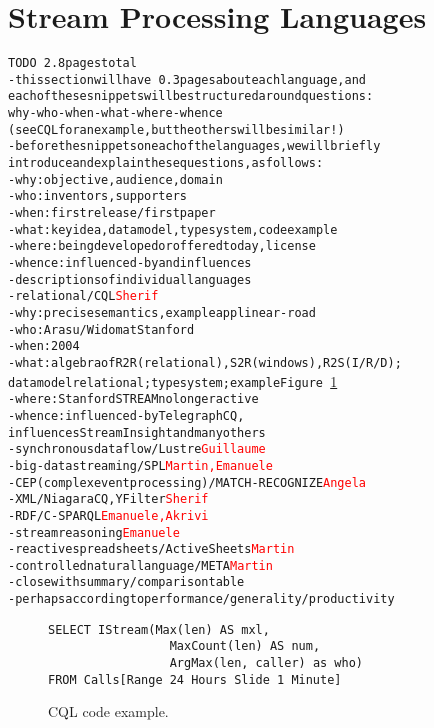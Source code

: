 \section{Stream Processing Languages}\label{sec:languages}

\begin{alltt}TODO\scriptsize ~2.8 pages total
- this section will have ~0.3 pages about each language, and
  each of these snippets will be structured around questions:
  why-who-when-what-where-whence
  (see CQL for an example, but the others will be similar!)
- before the snippets on each of the languages, we will briefly
  introduce and explain these questions, as follows:
  - why: objective, audience, domain
  - who: inventors, supporters
  - when: first release / first paper
  - what: key idea, data model, type system, code example
  - where: being developed or offered today, license
  - whence: influenced-by and influences
- descriptions of individual languages
  - relational / CQL \cite{arasu_babu_widom_2006}   \textcolor{red}{Sherif}
    - why: precise semantics \cite{arasu_widom_2004}, example app linear-road \cite{arasu_et_al_2004}
    - who: Arasu/Widom at Stanford
    - when: 2004
    - what: algebra of R2R (relational), S2R (windows), R2S (I/R/D);
      data model relational; type system \cite{soule_et_al_2016}; example Figure~\ref{fig:cql}
    - where: Stanford STREAM no longer active
    - whence: influenced-by TelegraphCQ \cite{chandrasekaran_et_al_2003},
      influences StreamInsight \cite{ali_et_al_2009} and many others
  - synchronous dataflow / Lustre \cite{caspi_et_al_1987} \textcolor{red}{Guillaume}
  - big-data streaming / SPL \cite{hirzel_schneider_gedik_2017} \textcolor{red}{Martin, Emanuele}
  - CEP (complex event processing) / MATCH-RECOGNIZE \cite{zemke_et_al_2007} \cite{hirzel_2012} \textcolor{red}{Angela}
  - XML / NiagaraCQ \cite{chen_et_al_2000}, YFilter \cite{diao_et_al_2002} \textcolor{red}{Sherif}
  - RDF / C-SPARQL \cite{barbieri_et_al_2009} \textcolor{red}{Emanuele, Akrivi}
  - stream reasoning \textcolor{red}{Emanuele}
  - reactive spreadsheets / ActiveSheets \cite{vaziri_et_al_2014} \textcolor{red}{Martin}
  - controlled natural language / META \cite{arnold_et_al_2016} \textcolor{red}{Martin}
- close with summary/comparison table
  - perhaps according to performance/generality/productivity
\end{alltt}

\begin{figure}
\begin{lstlisting}
SELECT IStream(Max(len) AS mxl,
                 MaxCount(len) AS num,
                 ArgMax(len, caller) as who)
FROM Calls[Range 24 Hours Slide 1 Minute]
\end{lstlisting}
\vspace*{-4mm}
\caption{\label{fig:cql}CQL code example.}
\end{figure}

